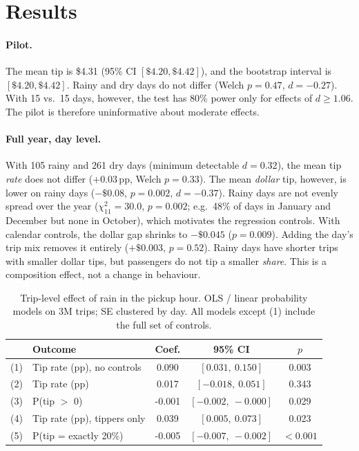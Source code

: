 \documentclass[11pt,a4paper]{article}
\begin{document}
\section{Results}
\paragraph{Pilot.} The mean tip is \$4.31 (95\% CI $[\$4.20, \$4.42]$), and the bootstrap interval is
$[\$4.20, \$4.42]$. Rainy and dry days do not differ (Welch $p=0.47$, $d=-0.27$). With 15 vs.\ 15 days,
however, the test has 80\% power only for effects of $d \geq 1.06$. The pilot is therefore uninformative about
moderate effects.

\paragraph{Full year, day level.} With 105 rainy and 261 dry days (minimum detectable $d=0.32$), the mean tip
\emph{rate} does not differ ($+0.03$\,pp, Welch $p=0.33$). The mean \emph{dollar} tip, however, is lower on rainy
days ($-\$0.08$, $p=0.002$, $d=-0.37$). Rainy days are not evenly spread over the year ($\chi^2_{11}=30.0$,
$p=0.002$; e.g.\ 48\% of days in January and December but none in October), which motivates the regression
controls. With calendar controls, the dollar gap shrinks to $-\$0.045$ ($p=0.009$). Adding the day's trip mix
removes it entirely ($+\$0.003$, $p=0.52$). Rainy days have shorter trips with smaller dollar tips, but
passengers do not tip a smaller \emph{share}. This is a composition effect, not a change in behaviour.

\begin{table}[t]
\centering
\small
\caption{Trip-level effect of rain in the pickup hour. OLS / linear probability models on 3M trips; SE clustered
by day. All models except (1) include the full set of controls.}
\label{tab:main}
\begin{tabular}{llS[table-format=-1.3]cc}
\toprule
& Outcome & {Coef.} & 95\% CI & $p$ \\
\midrule
(1) & Tip rate (pp), no controls      &  0.090 & $[0.031,\ 0.150]$   & 0.003 \\
(2) & Tip rate (pp)                   &  0.017 & $[-0.018,\ 0.051]$  & 0.343 \\
(3) & P(tip $>$ 0)                    & -0.001 & $[-0.002,\ -0.000]$ & 0.029 \\
(4) & Tip rate (pp), tippers only     &  0.039 & $[0.005,\ 0.073]$   & 0.023 \\
(5) & P(tip = exactly 20\%)           & -0.005 & $[-0.007,\ -0.002]$ & $<0.001$ \\
\bottomrule
\end{tabular}
\end{table}
\end{document}
